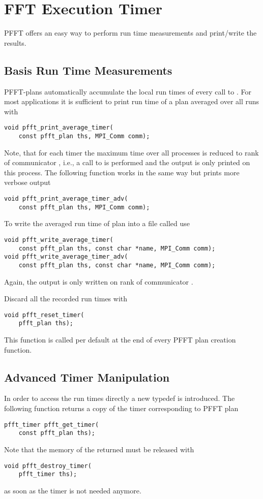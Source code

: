\section{FFT Execution Timer}
PFFT offers an easy way to perform run time measurements and print/write the results.

\subsection{Basis Run Time Measurements}
PFFT-plans automatically accumulate the local run times of every call to .
For most applications it is sufficient to print run time of a plan  averaged over all runs with
\begin{lstlisting}
void pfft_print_average_timer(
    const pfft_plan ths, MPI_Comm comm);
\end{lstlisting}
Note, that for each timer the maximum time over all processes is reduced to rank  of communicator ,
i.e., a call to  is performed and the output is only printed on this process.
The following function works in the same way but prints more verbose output
\begin{lstlisting}
void pfft_print_average_timer_adv(
    const pfft_plan ths, MPI_Comm comm);
\end{lstlisting}

To write the averaged run time of plan  into a file called  use
\begin{lstlisting}
void pfft_write_average_timer(
    const pfft_plan ths, const char *name, MPI_Comm comm);
void pfft_write_average_timer_adv(
    const pfft_plan ths, const char *name, MPI_Comm comm);
\end{lstlisting}
Again, the output is only written on rank  of communicator .

Discard all the recorded run times with
\begin{lstlisting}
void pfft_reset_timer(
    pfft_plan ths);
\end{lstlisting}
This function is called per default at the end of every PFFT plan creation function.

\subsection{Advanced Timer Manipulation}
In order to access the run times directly a new typedef  is introduced.
The following function returns a copy of the timer corresponding to PFFT plan 
\begin{lstlisting}
pfft_timer pfft_get_timer(
    const pfft_plan ths);
\end{lstlisting}
Note that the memory of the returned  must be released with
\begin{lstlisting}
void pfft_destroy_timer(
    pfft_timer ths);
\end{lstlisting}
as soon as the timer is not needed anymore. 

